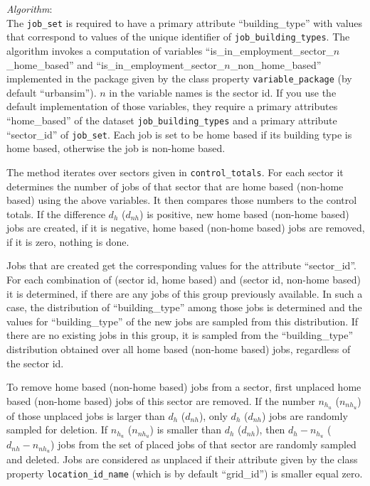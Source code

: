 {\it Algorithm}:~\\[1mm]
The \verb|job_set| is required to have a primary attribute \primaryattributesindex
``building_type'' with values that correspond to values of the unique identifier of \verb|job_building_types|.
The algorithm invokes a computation of variables \variablesindex
``is_in_employment_sector_$n$_home_based'' and
``is_in_employment_sector_$n$_non_home_based'' implemented in the package
given by the class property \verb|variable_package| \variablesindex (by default
``urbansim''). $n$ in the variable \variablesindex names is the sector id. If you use
the default  implementation of those variables, \variablesindex they require
a primary attributes \primaryattributesindex ``home_based'' of the dataset \verb|job_building_types|
and a primary attribute ``sector_id'' of \verb|job_set|. Each job is set to be home based if its building 
type is home based, otherwise the job is non-home based.  

The method iterates over sectors given in \verb|control_totals|. For each
sector it determines the number of jobs of that sector that are home based
(non-home based) using the above variables. \variablesindex It then compares those numbers to
the control totals.  If the difference $d_h$ ($d_{nh}$) is positive, new home
based (non-home based) jobs are created, if it is negative, home based
(non-home based) jobs are removed, if it is zero, nothing is done.

Jobs that are created get the corresponding values for the attribute \attributesindex
``sector_id''. For each combination of (sector id, home based) and (sector id, non-home based) 
it is determined, if there are any jobs of this group
previously available. In such a case, the distribution of ``building_type'' among those jobs is
determined and the values for ``building_type'' of the new jobs are sampled
from this distribution. If there are no existing jobs in this group, it is
sampled from the ``building_type'' distribution obtained over all home based
(non-home based) jobs, regardless of the sector id.

To remove home based (non-home based) jobs from a sector, first unplaced home
based (non-home based) jobs of this sector are removed. If the number $n_{h_u}$
($n_{nh_u}$) of those unplaced jobs is larger than $d_h$ ($d_{nh}$), only
$d_h$ ($d_{nh}$) jobs are randomly sampled for deletion. If $n_{h_u}$
($n_{nh_u}$) is smaller than $d_h$ ($d_{nh}$), then $d_h-n_{h_u}$
($d_{nh}-n_{nh_u}$) jobs from the set of placed jobs of that sector are
randomly sampled and deleted. Jobs are considered as unplaced if their
attribute \attributesindex given by the class property \verb|location_id_name| (which is by
default ``grid_id'') is smaller equal zero.


